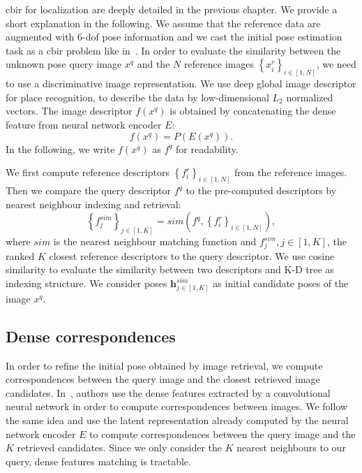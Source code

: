 \Ac{cbir} for localization are deeply detailed in the previous chapter. We provide a short explanation in the following.  We assume that the reference data are augmented with 6-\ac{dof} pose information and we cast the initial pose estimation task as a \ac{cbir} problem like in~\cite{Balntas2018}. In order to evaluate the similarity between the unknown pose query image $x^q$ and the $N$ reference images $\left\{ x_{i}^r \right\}_{i\in\left[1,N\right]}$, we need to use a discriminative image representation. We use deep global image descriptor for place recognition, to describe the data by low-dimensional $L_2$ normalized vectors. The image descriptor $f(x^q) $ is obtained by concatenating the dense feature from neural network encoder $E$: 
\begin{equation}
	f(x^q) = P(E(x^q)).
\end{equation}
\noindent In the following, we write $f(x^q)$ as $f^q$ for readability.

We first compute reference descriptors $\left\{ f_{i}^r \right\}_{i\in\left[1,N\right]}$ from the reference images. Then we compare the query descriptor $f^q$ to the pre-computed descriptors by nearest neighbour indexing and retrieval:
\begin{equation}
	\left\{ f^{sim}_j \right\}_{j\in\left[1, K\right]} = sim \left( f^q, \left\{ f^r_i\right\}_{i\in\left[1,N\right]} \right),
\end{equation}
where $sim$ is the nearest neighbour matching function and $f^{sim}_j, j \in [1, K]$, the ranked $K$ closest reference descriptors to the query descriptor. We use cosine similarity to evaluate the similarity between two descriptors and K-D tree as indexing structure. We consider poses $\mathbf{h}^{sim}_{j \in [1, K]}$ as initial candidate poses of the image $x^q$.

\subsection{Dense correspondences}
\label{subsec:matching}
In order to refine the initial pose obtained by image retrieval, we compute correspondences between the query image and the closest retrieved image candidates. In~\citep{Taira2018, Noh2017, Widya2018}, authors use the dense features extracted by a convolutional neural network in order to compute correspondences between images. We follow the same idea and use the latent representation already computed by the neural network encoder $E$ to compute correspondences between the query image and the $K$ retrieved candidates. Since we only consider the $K$ nearest neighbours to our query, dense features matching is tractable.

